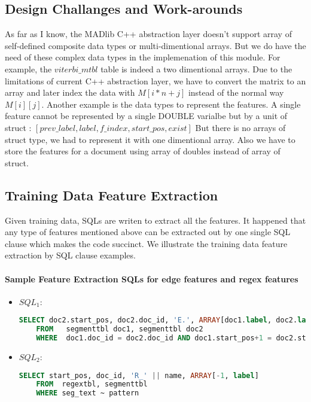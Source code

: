 \subsection{Design Challanges and Work-arounds}
As far as I know, the MADlib C++ abstraction layer doesn't support array of self-defined composite data types or multi-dimentional arrays.
But we do have the need of these complex data types in the implemenation of this module. For example, the
$viterbi\_mtbl$ table is indeed a two dimentional arrays. Due to the limitations of current C++ abstraction layer, we have to convert the matrix
to an array and later index the data with  $M[i*n+j]$ instead of the normal way $M[i][j]$. Another example is the data types to represent the
features. A single feature cannot be represented by a single DOUBLE varialbe but by a unit of struct : $[prev\_label, label, f\_index, start\_pos, exist]$
But there is no arrays of struct type, we had to represent it with one dimentional array.
Also we have to store the features for a document using  array of doubles instead of array of struct.

\subsection{Training Data Feature Extraction}
Given training data, SQLs are writen to extract all the features. It happened that any type of features mentioned above can be extracted out by one single SQL clause which makes the code succinct. We illustrate the training data feature extraction by SQL clause examples.

\paragraph{Sample Feature Extraction SQLs for edge features and regex features}
\begin{itemize}
\item $SQL_1$:\\
\begin{lstlisting}[language=SQL,gobble=4]
    SELECT doc2.start_pos, doc2.doc_id, 'E.', ARRAY[doc1.label, doc2.label]
    FROM   segmenttbl doc1, segmenttbl doc2
    WHERE  doc1.doc_id = doc2.doc_id AND doc1.start_pos+1 = doc2.start_pos
\end{lstlisting}

\item $SQL_2$:\\
\begin{lstlisting}[language=SQL,gobble=4]
    SELECT start_pos, doc_id, 'R_' || name, ARRAY[-1, label]
    FROM  regextbl, segmenttbl
    WHERE seg_text ~ pattern
\end{lstlisting}
\end{itemize}

